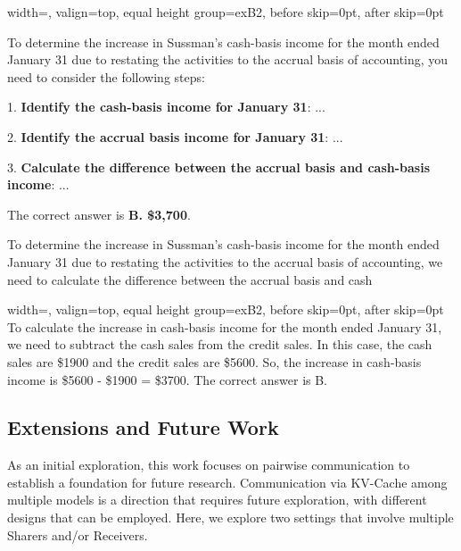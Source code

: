 \medskip
\noindent
\begin{minipage}[t]{0.49\linewidth}
\begin{bluebox}{width=\linewidth, valign=top, equal height group=exB2, before skip=0pt, after skip=0pt}

\medskip
To determine the increase in Sussman's cash-basis income for the month ended January 31 due to restating the activities to the accrual basis of accounting, you need to consider the following steps:

1. \textbf{Identify the cash-basis income for January 31}: ...

2. \textbf{Identify the accrual basis income for January 31}: ...

3. \textbf{Calculate the difference between the accrual basis and cash-basis income}: ...
\medskip

\medskip

The correct answer is \textbf{B. \$3,700}.

To determine the increase in Sussman's cash-basis income for the month ended January 31 due to restating the activities to the accrual basis of accounting, we need to calculate the difference between the accrual basis and cash
\medskip
\end{bluebox}
\end{minipage}
\hfill
\begin{minipage}[t]{0.49\linewidth}
\begin{bluebox}[C2C Response]{width=\linewidth, valign=top, equal height group=exB2, before skip=0pt, after skip=0pt}
To calculate the increase in cash-basis income for the month ended January 31, we need to subtract the cash sales from the credit sales. In this case, the cash sales are \$1900 and the credit sales are \$5600. So, the increase in cash-basis income is \$5600 - \$1900 = \$3700.
The correct answer is B.
\end{bluebox}
\end{minipage}

\subsection{\name Extensions and Future Work}

As an initial exploration, this work focuses on pairwise communication to establish a foundation for future research. Communication via KV-Cache among multiple models is a direction that requires future exploration, with different designs that can be employed. Here, we explore two settings that involve multiple Sharers and/or Receivers.

